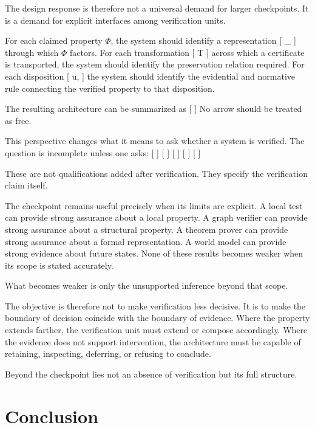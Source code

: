 \documentclass[11pt]{article}
\begin{document}
The design response is therefore not a universal demand for larger checkpoints. It is a demand for explicit interfaces among verification units.

For each claimed property $\Phi$, the system should identify a representation
[
\pi_\Phi
]
through which $\Phi$ factors. For each transformation
[
T
]
across which a certificate is transported, the system should identify the preservation relation required. For each disposition
[
u,
]
the system should identify the evidential and normative rule connecting the verified property to that disposition.

The resulting architecture can be summarized as
[
]
No arrow should be treated as free.

This perspective changes what it means to ask whether a system is verified. The question is incomplete unless one asks:
[
]
[
]
[
]
[
]
[
]

These are not qualifications added after verification. They specify the verification claim itself.

The checkpoint remains useful precisely when its limits are explicit. A local test can provide strong assurance about a local property. A graph verifier can provide strong assurance about a structural property. A theorem prover can provide strong assurance about a formal representation. A world model can provide strong evidence about future states. None of these results becomes weaker when its scope is stated accurately.

What becomes weaker is only the unsupported inference beyond that scope.

The objective is therefore not to make verification less decisive. It is to make the boundary of decision coincide with the boundary of evidence. Where the property extends farther, the verification unit must extend or compose accordingly. Where the evidence does not support intervention, the architecture must be capable of retaining, inspecting, deferring, or refusing to conclude.

Beyond the checkpoint lies not an absence of verification but its full structure.

\section{Conclusion}
\end{document}
